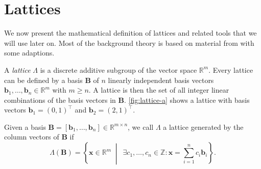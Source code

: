 \section{Lattices}
We now present the mathematical definition of lattices and related tools that we will use later on. Most of the background theory is based on material from \cite{MG02} with some adaptions.

A \textit{lattice} $\Lambda$ is a discrete additive subgroup of the vector space $\mathbb{R}^m$. Every lattice can be defined by a basis $\mathbf{B}$ of $n$ linearly independent basis vectors $\mathbf{b}_1, \ldots, \mathbf{b}_n \in \mathbb{R}^m$ with $m\geq n$. A lattice is then the set of all integer linear combinations of the basis vectors in $\mathbf{B}$. \cref{fig:lattice-a} shows a lattice with basis vectors $\mathbf{b}_1 = (0, 1)^\intercal$ and $\mathbf{b}_2 = (2, 1)^\intercal$.

\begin{definition}[Lattice]
    Given a basis $\mathbf{B} = \left[\mathbf{b}_1, \ldots, \mathbf{b}_n\right] \in \mathbb{R}^{m\times n}$, we call $\Lambda$ a lattice generated by the column vectors of $\mathbf{B}$ if
    \begin{equation}
        \Lambda(\mathbf{B}) = \left\{ \mathbf{x} \in \mathbb{R}^m \;\middle\vert\ \; \exists c_1, \ldots, c_n \in \mathbb{Z} : \mathbf{x} = \sum_{i=1}^n c_i \mathbf{b}_i \right\}.
    \end{equation}
\end{definition}

